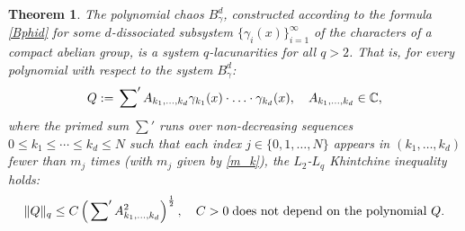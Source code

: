 \documentclass[12pt]{article}
\newtheorem{theorem}{Theorem}  %
\begin{document}
	\begin{theorem} \label{THEOREM-1} 
The polynomial chaos $B^d_{\gamma}$, constructed according to the formula \eqref{Bphid} for some $d$-dissociated subsystem $\{\gamma_{i}(x)\}_{i=1}^{\infty}$ of the characters of a compact abelian group, is a system $q$-lacunarities for all $q>2$. That is, for every polynomial with respect to the system $B^d_{\gamma}$:
		\begin{equation}\label{chaosQ}
			Q := \sideset{}{'}{\sum} A_{k_1, \ldots, k_d} \gamma_{k_1}(x) \cdot \ldots \cdot \gamma_{k_d}(x), \quad A_{k_1, \ldots, k_d} \in \mathbb{C},
		\end{equation} 
 where the primed sum $\sum'$ runs over non-decreasing sequences $0 \leq k_1 \leq \cdots \leq k_d \leq N$ such that each index $j \in \{0, 1, \ldots, N\}$ appears in $(k_1, \ldots, k_d)$ fewer than $m_j$ times (with $m_j$ given by \eqref{m_k}), the $L_2$-$L_q$ Khintchine inequality holds:
		\begin{equation} \label{THEOREM-1-eq}
			\|Q\|_{q} \le C \left(\sideset{}{'}{\sum} A_{k_1, \ldots, k_d}^2\right)^{\frac{1}{2}}, \quad C>0 \; \text{does not depend on the polynomial $Q$}.
		\end{equation}
	\end{theorem}
\end{document}
